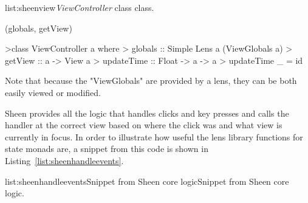\vspace{-0.5em}
\begin{listing}{list:sheenview}{\emph{ViewController} class}{ class.}{}
\end{listing}\vspace{-1.5em}

\functions(globals, getView)
\begin{haskell}

>class ViewController a where
>  globals :: Simple Lens a (ViewGlobals a)
>  getView :: a -> View a
>  updateTime :: Float -> a -> a
>  updateTime _ = id

\end{haskell}
\noindent 
Note that because the "ViewGlobals" are provided by a lens, they can be both easily viewed or modified. 

Sheen provides all the logic that handles clicks and key presses and calls the handler at the correct view based on where the click was and what view is currently in focus. In order to illustrate how useful the lens library functions for state monads are, a snippet from this code is shown in Listing~\ref{list:sheenhandleevents}.

\vspace{-0.5em}
\begin{listing}{list:sheenhandleevents}{Snippet from Sheen core logic}{Snippet from Sheen core logic.}{}
\end{listing}\vspace{-1.5em}

